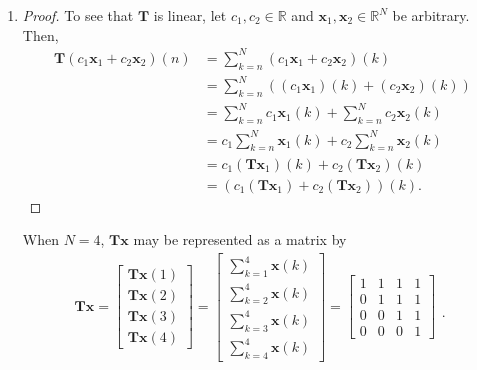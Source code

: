\documentclass[12pt]{amsart}
\begin{document}


\begin{enumerate}[label=\arabic*.]
	\item
\begin{proof}
	To see that $\mathbf{T}$ is linear, 
	let \(c_1,c_2\in\mathbb{R}\) and 
	\(\mathbf{x}_1, \mathbf{x}_2 \in \mathbb{R}^N\) be arbitrary. Then,
	\begin{align*}
		\mathbf{T}(c_1\mathbf{x}_1 + c_2\mathbf{x}_2)(n)
		&= \sum_{k=n}^{N}(c_1\mathbf{x}_1 + c_2\mathbf{x}_2)(k) \\
		&= \sum_{k=n}^{N}((c_1\mathbf{x}_1)(k) + (c_2\mathbf{x}_2)(k)) \\
		&= \sum_{k=n}^{N}c_1\mathbf{x}_1(k) + \sum_{k=n}^{N}c_2\mathbf{x}_2(k) \\
		&= c_1\sum_{k=n}^{N}\mathbf{x}_1(k) + c_2\sum_{k=n}^{N}\mathbf{x}_2(k) \\
		&= c_1(\mathbf{T}\mathbf{x}_1)(k) + c_2(\mathbf{T}\mathbf{x}_2)(k) \\
		&= (c_1(\mathbf{T}\mathbf{x}_1) + c_2(\mathbf{T}\mathbf{x}_2))(k).
	\end{align*}
\end{proof}
When \(N=4\), $\mathbf{T}\mathbf{x}$ may be represented as a matrix by
\begin{align*}
	\mathbf{T}\mathbf{x}
	= \begin{bmatrix} \mathbf{T}\mathbf{x}(1) \\ \mathbf{T}\mathbf{x}(2) \\ \mathbf{T}\mathbf{x}(3) \\ \mathbf{T}\mathbf{x}(4) \end{bmatrix}
	= \begin{bmatrix} \sum_{k=1}^{4}\mathbf{x}(k) \\ \sum_{k=2}^{4}\mathbf{x}(k) \\ \sum_{k=3}^{4}\mathbf{x}(k) \\ \sum_{k=4}^{4}\mathbf{x}(k) \end{bmatrix}
	= \begin{bmatrix} 1&1&1&1 \\ 0&1&1&1 \\ 0&0&1&1 \\ 0&0&0&1 \end{bmatrix} 
	\begin{matrix} \\ \\ \\ . \end{matrix}
\end{align*}


\end{enumerate}
\end{document}
